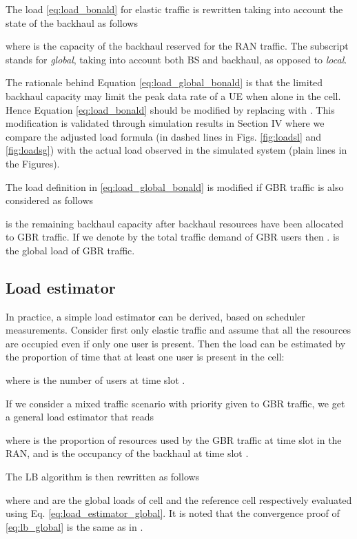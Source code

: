 \documentclass[10pt,draftclsnofoot,onecolumn]{IEEEtran}
\begin{document}
    The load \eqref{eq:load_bonald} for elastic traffic is rewritten taking into account the state of the backhaul as follows

    
    where  is the capacity of the backhaul reserved for the \ac{RAN} traffic. The subscript 
stands for \emph{global}, taking into account both \ac{BS} and
backhaul, as opposed to \emph{local}. 

The rationale behind Equation \eqref{eq:load_global_bonald} is
that the limited backhaul capacity may limit the peak data rate of a
\ac{UE} when alone in the cell. Hence Equation
\eqref{eq:load_bonald} should be modified by replacing  with
. This modification is validated through
simulation results in Section IV where we compare the adjusted load
formula (in dashed lines in Figs. \ref{fig:loadsl} and
\ref{fig:loadsg}) with the actual load observed in the simulated
system (plain lines in the Figures).

    The load definition in \eqref{eq:load_global_bonald} 
    is modified if \ac{GBR} traffic is also
considered as follows


 is the remaining backhaul capacity after backhaul
resources have been allocated to \ac{GBR} traffic. If we denote by  the total traffic demand of \ac{GBR} users then .  is the global load of \ac{GBR} traffic.

    \subsection*{Load estimator}
    In practice, a simple load estimator can be derived, based on scheduler
measurements. Consider first only elastic traffic and assume that
all the resources are occupied even if only one user is
present. Then the load can be estimated by the proportion of time
that at least one user is present in the cell:
    
    where  is the number of users at time slot .



    If we consider a mixed traffic scenario with priority 
    given to \ac{GBR} traffic, we get a general
load estimator  that reads
    
where  is the proportion of resources used by the \ac{GBR} traffic
at time slot  in the \ac{RAN}, and  is the occupancy of the
backhaul at time slot .

    The \ac{LB} algorithm is then rewritten as follows
    
where  and  are the global loads of cell 
and the reference cell  respectively evaluated using Eq.
\eqref{eq:load_estimator_global}. It is noted that the convergence proof of \eqref{eq:lb_global} is the same as in \cite{combes_selforganizationwireless_2012}.
\end{document}
